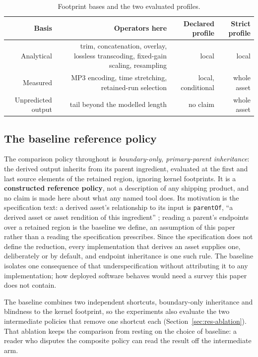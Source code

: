 \documentclass[preprint,3p,11pt,authoryear]{elsarticle}
\begin{document}
\begin{table}[t]
\centering
\caption{Footprint bases and the two evaluated profiles.}
\label{tab:profiles}
\footnotesize
\begin{tabular}{R{0.19}R{0.35}R{0.16}R{0.16}}
\toprule
Basis & Operators here & Declared profile & Strict profile \\
\midrule
Analytical & trim, concatenation, overlay, lossless transcoding, fixed-gain scaling, resampling & local & local \\
Measured & MP3 encoding, time stretching, retained-run selection & local, conditional & whole asset \\
Unpredicted output & tail beyond the modelled length & no claim & whole asset \\
\bottomrule
\end{tabular}
\end{table}


\subsection{The baseline reference policy}
\label{sec:baseline}

The comparison policy throughout is \emph{boundary-only, primary-parent
inheritance}: the derived output inherits from its parent ingredient, evaluated
at the first and last source elements of the retained region, ignoring kernel
footprints. It is a \textbf{constructed reference policy}, not a description
of any shipping product, and no claim is made here about what any named tool
does. Its motivation is the specification text: a derived asset's relationship
to its input is \texttt{parentOf}, ``a derived asset or asset rendition of this
ingredient'' \citep[Table~10, \S18.16.3]{c2pa24}; reading a parent's
endpoints over a retained region is the baseline we define, an assumption of
this paper rather than a reading the specification prescribes. Since
the specification does not define the reduction, every implementation that
derives an asset supplies one, deliberately or by default, and endpoint
inheritance is one such rule. The
baseline isolates one consequence of that underspecification without
attributing it to any implementation; how deployed software behaves would need
a survey this paper does not contain.

The baseline combines two independent shortcuts, boundary-only inheritance and
blindness to the kernel footprint, so the experiments also evaluate the two
intermediate policies that remove one shortcut each
(Section~\ref{sec:res-ablation}). That ablation keeps the comparison from
resting on the choice of baseline: a reader who disputes the composite policy
can read the result off the intermediate arm.
\end{document}
